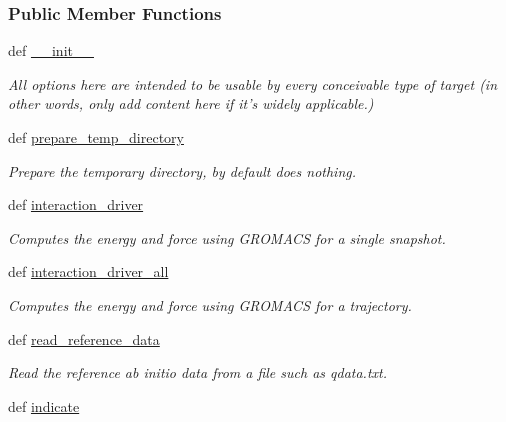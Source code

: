 \subsubsection*{\-Public \-Member \-Functions}
\begin{DoxyCompactItemize}
\item 
def \hyperlink{classforcebalance_1_1gmxio_1_1Interaction__GMX_a325cf41b32aa979201a35329f7c9d546}{\-\_\-\-\_\-init\-\_\-\-\_\-}
\begin{DoxyCompactList}\small\item\em \-All options here are intended to be usable by every conceivable type of target (in other words, only add content here if it's widely applicable.) \end{DoxyCompactList}\item 
def \hyperlink{classforcebalance_1_1gmxio_1_1Interaction__GMX_a2dee88df57edbb437dbf69678038dd17}{prepare\-\_\-temp\-\_\-directory}
\begin{DoxyCompactList}\small\item\em \-Prepare the temporary directory, by default does nothing. \end{DoxyCompactList}\item 
def \hyperlink{classforcebalance_1_1gmxio_1_1Interaction__GMX_a8ce5c501d7ca8ae08ee2f5c21a67e0fc}{interaction\-\_\-driver}
\begin{DoxyCompactList}\small\item\em \-Computes the energy and force using \-G\-R\-O\-M\-A\-C\-S for a single snapshot. \end{DoxyCompactList}\item 
def \hyperlink{classforcebalance_1_1gmxio_1_1Interaction__GMX_a5bac92638e1962f1ccbe189f4e20898b}{interaction\-\_\-driver\-\_\-all}
\begin{DoxyCompactList}\small\item\em \-Computes the energy and force using \-G\-R\-O\-M\-A\-C\-S for a trajectory. \end{DoxyCompactList}\item 
def \hyperlink{classforcebalance_1_1interaction_1_1Interaction_aa67c082c3b6fa2d87ba3f4cf1a74e4f8}{read\-\_\-reference\-\_\-data}
\begin{DoxyCompactList}\small\item\em \-Read the reference ab initio data from a file such as qdata.\-txt. \end{DoxyCompactList}\item 
def \hyperlink{classforcebalance_1_1interaction_1_1Interaction_a91f94b978b73dd886035dcdb96b53cc1}{indicate}

\end{DoxyCompactItemize}
